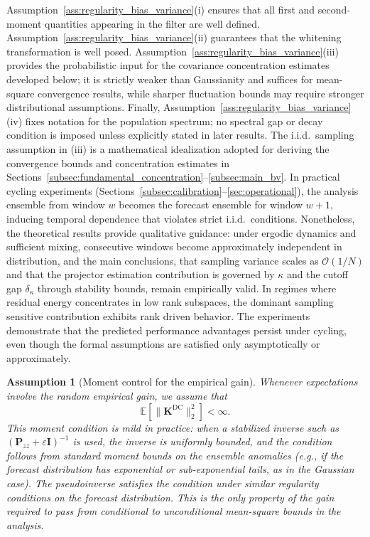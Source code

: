 \documentclass[11pt,a4paper]{article}
\newtheorem{assumption}{Assumption}
\begin{document}
\noindent
Assumption~\ref{ass:regularity_bias_variance}(i) ensures that all first and second-moment quantities appearing in the filter are well defined. Assumption~\ref{ass:regularity_bias_variance}(ii) guarantees that the whitening transformation is well posed. Assumption~\ref{ass:regularity_bias_variance}(iii) provides the probabilistic input for the covariance concentration estimates developed below; it is strictly weaker than Gaussianity and suffices for mean-square convergence results, while sharper fluctuation bounds may require stronger distributional assumptions. Finally, Assumption~\ref{ass:regularity_bias_variance}(iv) fixes notation for the population spectrum; no spectral gap or decay condition is imposed unless explicitly stated in later results.
The i.i.d.\ sampling assumption in (iii) is a mathematical idealization adopted for deriving the convergence bounds and concentration estimates in Sections~\ref{subsec:fundamental_concentration}--\ref{subsec:main_bv}. In practical cycling experiments (Sections~\ref{subsec:calibration}--\ref{sec:operational}), the analysis ensemble from window $w$ becomes the forecast ensemble for window $w+1$, inducing temporal dependence that violates strict i.i.d.\ conditions.
Nonetheless, the theoretical results provide qualitative guidance: under ergodic dynamics and sufficient mixing, consecutive windows become approximately independent in distribution, and the main conclusions, that sampling variance scales as $\mathcal{O}(1/N)$ and that the projector estimation contribution is governed by $\kappa$ and the cutoff gap $\delta_\kappa$ through stability bounds, remain empirically valid. In regimes where residual energy concentrates in low rank subspaces, the dominant sampling sensitive contribution exhibits rank driven behavior.
The experiments demonstrate that the predicted performance advantages persist under cycling, even though the formal assumptions are satisfied only asymptotically or approximately.
\par\smallskip

\begin{assumption}[Moment control for the empirical gain]
\label{ass:gain_moment}
Whenever expectations involve the random empirical gain, we assume that
\begin{equation}
\mathbb{E}\!\left[\|\mathbf{K}^{\mathrm{DC}}\|_2^{2}\right]<\infty.
\end{equation}
This moment condition is mild in practice: when a stabilized inverse such as $(\mathbf{P}_{zz}+\varepsilon\mathbf{I})^{-1}$ is used, the inverse is uniformly bounded, and the condition follows from standard moment bounds on the ensemble anomalies (e.g., if the forecast distribution has exponential or sub-exponential tails, as in the Gaussian case). The pseudoinverse satisfies the condition under similar regularity conditions on the forecast distribution. This is the only property of the gain required to pass from conditional to unconditional mean-square bounds in the analysis.
\end{assumption}
\end{document}
